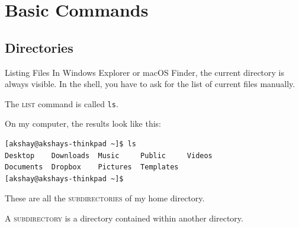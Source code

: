 \section{Basic Commands}

\subsection{Directories}

\begin{frame}[fragile]{Listing Files}
  In Windows Explorer or macOS Finder, the current directory is always visible.
  In the shell, you have to ask for the list of current files manually.

  \pause
  \alert<2>{The \textsc{list} command is called \texttt{ls}.}

  \pause
  \begin{example}[ls]
    On my computer, the results look like this:
    \begin{verbatim}
[akshay@akshays-thinkpad ~]$ ls
Desktop    Downloads  Music     Public     Videos
Documents  Dropbox    Pictures  Templates
[akshay@akshays-thinkpad ~]$ 
    \end{verbatim}
  \end{example}
  These are all the \textsc{subdirectories} of my home directory.
   {
    \begin{definition}[subdirectory]
      A \textsc{subdirectory} is a directory contained within another
      directory.
    \end{definition}
  }
\end{frame}

